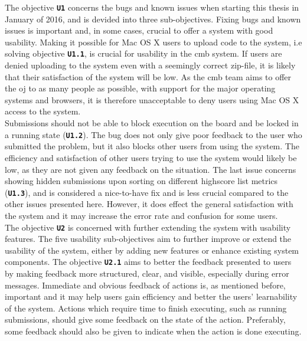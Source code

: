 The objective \textbf{\texttt{U1}} concerns the bugs and known issues when starting this thesis in January of 2016, and is devided into three sub-objectives. Fixing bugs and known issues is important and, in some cases, crucial to offer a system with good usability. Making it possible for Mac OS X users to upload code to the system, i.e solving objective \textbf{\texttt{U1.1}}, is crucial for usability in the \gls{cmb} system. If users are denied uploading to the system even with a seemingly correct zip-file, it is likely that their satisfaction of the system will be low. As the \gls{cmb} team aims to offer the \gls{oj} to as many people as possible, with support for the major operating systems and browsers, it is therefore unacceptable to deny users using Mac OS X access to the system. \\

Submissions should not be able to block execution on the board and be locked in a running state (\textbf{\texttt{U1.2}}). The bug does not only give poor feedback to the user who submitted the problem, but it also blocks other users from using the system. The efficiency and satisfaction of other users trying to use the system would likely be low, as they are not given any feedback on the situation. The last issue concerns showing hidden submissions upon sorting on different highscore list metrics (\textbf{\texttt{U1.3}}), and is considered a nice-to-have fix and is less crucial compared to the other issues presented here. However, it does effect the general satisfaction with the system and it may increase the error rate and confusion for some users. \\

The objective \textbf{\texttt{U2}} is concerned with further extending the system with usability features. The five usability sub-objectives aim to further improve or extend the usability of the system, either by adding new features or enhance existing system components. The objective \textbf{\texttt{U2.1}} aims to better the feedback presented to users by making feedback more structured, clear, and visible, especially during error messages. Immediate and obvious feedback of actions is, as mentioned before, important and it may help users gain efficiency and better the users' learnability of the system. Actions which require time to finish executing, such as running submissions, should give some feedback on the state of the action. Preferably, some feedback should also be given to indicate when the action is done executing. \\

